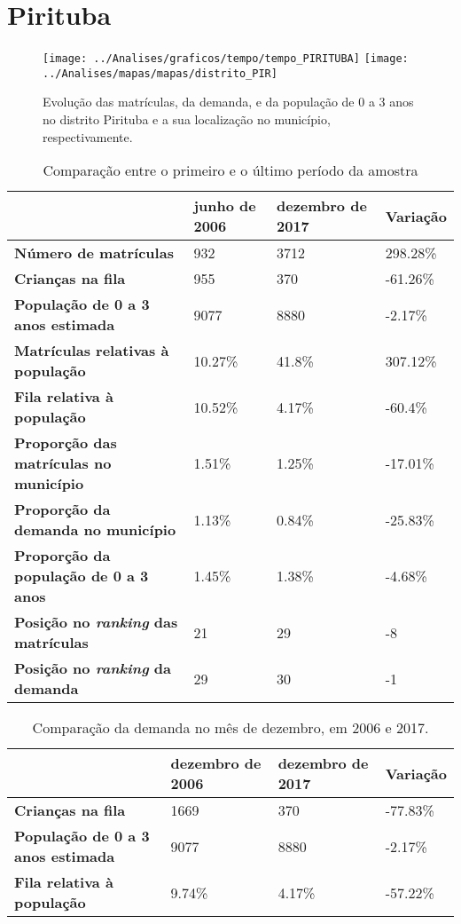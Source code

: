 \section{Pirituba}
\begin{figure}[H]
	\centering
	\texttt{[image: ../Analises/graficos/tempo/tempo\_PIRITUBA]}
	\texttt{[image: ../Analises/mapas/mapas/distrito\_PIR]}
	\caption{Evolução das matrículas, da demanda, e da população de 0 a 3 anos no distrito Pirituba e a sua localização no município, respectivamente.}
\end{figure}
\begin{table}[H]
	\begin{tabular}{|l|l|l|l|}
		\hline
		\textbf{}                                      & \textbf{junho de 2006}       & \textbf{dezembro de 2017}    & \textbf{Variação} \\ \hline
		\textbf{Número de matrículas}                  & 932 & 3712 & 298.28\% \\ \hline
		\textbf{Crianças na fila}                      & 955 & 370 & -61.26\% \\ \hline
		\textbf{População de 0 a 3 anos estimada}      & 9077 & 8880 & -2.17\% \\ \hline
		\textbf{Matrículas relativas à população}      & 10.27\% & 41.8\% & 307.12\% \\ \hline
		\textbf{Fila relativa à população}             & 10.52\% & 4.17\% & -60.4\% \\ \hline
		\textbf{Proporção das matrículas no município} & 1.51\% & 1.25\% & -17.01\% \\ \hline
		\textbf{Proporção da demanda no município}     & 1.13\% & 0.84\% & -25.83\% \\ \hline
		\textbf{Proporção da população de 0 a 3 anos}  & 1.45\% & 1.38\% & -4.68\% \\ \hline
		\textbf{Posição no \textit{ranking} das matrículas}     & 21 & 29 & -8 \\ \hline
		\textbf{Posição no \textit{ranking} da demanda}         & 29 & 30 & -1 \\ \hline
	\end{tabular}
	\caption{Comparação entre o primeiro e o último período da amostra}
\end{table}
\begin{table}[H]
	\begin{tabular}{|l|l|l|l|}
		\hline
		\textbf{}                                 & \textbf{dezembro de 2006} & \textbf{dezembro de 2017} & \textbf{Variação} \\ \hline
		\textbf{Crianças na fila}                      & 1669 & 370 & -77.83\% \\ \hline
		\textbf{População de 0 a 3 anos estimada}      & 9077 & 8880 & -2.17\% \\ \hline
		\textbf{Fila relativa à população}             & 9.74\% & 4.17\% & -57.22\% \\ \hline
	\end{tabular}
	\caption{Comparação da demanda no mês de dezembro, em 2006 e 2017.}
\end{table}
